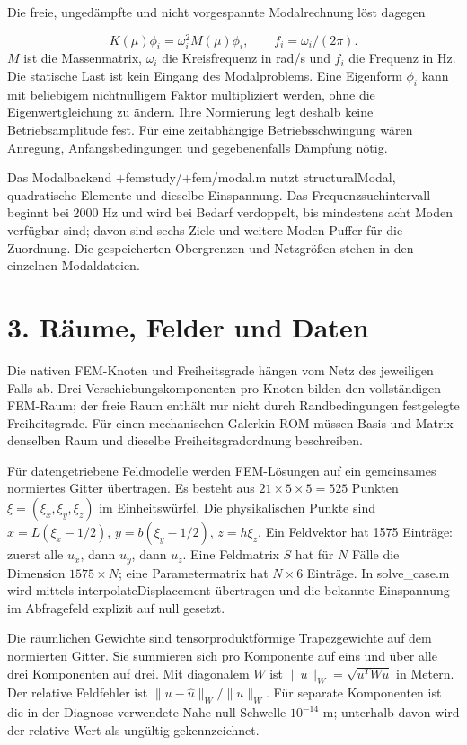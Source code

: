 \documentclass[11pt,a4paper]{article}
\begin{document}
Die freie, ungedämpfte und nicht vorgespannte Modalrechnung löst dagegen

\[K(\mu)\phi_i=\omega_i^2M(\mu)\phi_i,\qquad f_i=\omega_i/(2\pi).\]
$M$ ist die Massenmatrix, $\omega_i$ die Kreisfrequenz in rad/s und $f_i$ die Frequenz in Hz. Die statische Last ist kein Eingang des Modalproblems. Eine Eigenform $\phi_i$ kann mit beliebigem nichtnulligem Faktor multipliziert werden, ohne die Eigenwertgleichung zu ändern. Ihre Normierung legt deshalb keine Betriebsamplitude fest. Für eine zeitabhängige Betriebsschwingung wären Anregung, Anfangsbedingungen und gegebenenfalls Dämpfung nötig.

Das Modalbackend +femstudy/+fem/modal.m nutzt structuralModal, quadratische Elemente und dieselbe Einspannung. Das Frequenzsuchintervall beginnt bei 2000 Hz und wird bei Bedarf verdoppelt, bis mindestens acht Moden verfügbar sind; davon sind sechs Ziele und weitere Moden Puffer für die Zuordnung. Die gespeicherten Obergrenzen und Netzgrößen stehen in den einzelnen Modaldateien.

\section{3. Räume, Felder und Daten}
Die nativen FEM-Knoten und Freiheitsgrade hängen vom Netz des jeweiligen Falls ab. Drei Verschiebungskomponenten pro Knoten bilden den vollständigen FEM-Raum; der freie Raum enthält nur nicht durch Randbedingungen festgelegte Freiheitsgrade. Für einen mechanischen Galerkin-ROM müssen Basis und Matrix denselben Raum und dieselbe Freiheitsgradordnung beschreiben.

Für datengetriebene Feldmodelle werden FEM-Lösungen auf ein gemeinsames normiertes Gitter übertragen. Es besteht aus $21\times5\times5=525$ Punkten $\xi=(\xi_x,\xi_y,\xi_z)$ im Einheitswürfel. Die physikalischen Punkte sind $x=L(\xi_x-1/2)$, $y=b(\xi_y-1/2)$, $z=h\xi_z$. Ein Feldvektor hat 1575 Einträge: zuerst alle $u_x$, dann $u_y$, dann $u_z$. Eine Feldmatrix $S$ hat für $N$ Fälle die Dimension $1575\times N$; eine Parametermatrix hat $N\times6$ Einträge. In solve\_\allowbreak{}case.m wird mittels interpolateDisplacement übertragen und die bekannte Einspannung im Abfragefeld explizit auf null gesetzt.

Die räumlichen Gewichte sind tensorproduktförmige Trapezgewichte auf dem normierten Gitter. Sie summieren sich pro Komponente auf eins und über alle drei Komponenten auf drei. Mit diagonalem $W$ ist $\|u\|_W=\sqrt{u^TWu}$ in Metern. Der relative Feldfehler ist $\|u-\hat u\|_W/\|u\|_W$. Für separate Komponenten ist die in der Diagnose verwendete Nahe-null-Schwelle $10^{-14}$ m; unterhalb davon wird der relative Wert als ungültig gekennzeichnet.
\end{document}
